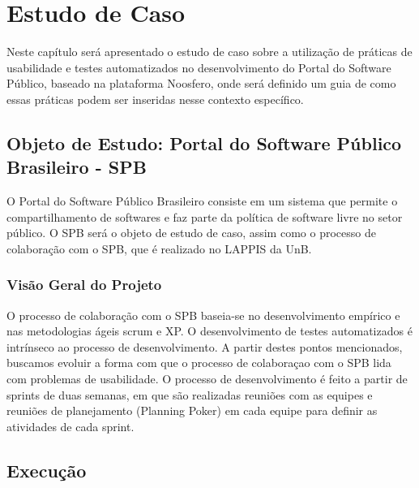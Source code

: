 \chapter{Estudo de Caso}

Neste capítulo será apresentado o estudo de caso sobre a utilização de práticas de usabilidade e testes automatizados no desenvolvimento do Portal do Software Público, baseado na plataforma Noosfero, onde será definido um guia de como essas práticas podem ser inseridas nesse contexto específico.

\section{Objeto de Estudo: Portal do Software Público Brasileiro - SPB}

O Portal do Software Público Brasileiro consiste em um sistema que permite o compartilhamento de softwares e faz parte da política de software livre no setor público.
O SPB será o objeto de estudo de caso, assim como o processo de colaboração com o SPB, que é realizado no LAPPIS da UnB.

\subsection{Visão Geral do Projeto}

O processo de colaboração com o SPB baseia-se no desenvolvimento empírico e nas metodologias ágeis scrum e XP. O desenvolvimento de testes automatizados é intrínseco ao processo de desenvolvimento. A partir destes pontos mencionados, buscamos evoluir a forma com que o processo de colaboraçao com o SPB lida com problemas de usabilidade.
O processo de desenvolvimento é feito a partir de sprints de duas semanas, em que são realizadas reuniões com as equipes e reuniões de planejamento (Planning Poker) em cada equipe para definir as atividades de cada sprint.



 
\section{Execução}




